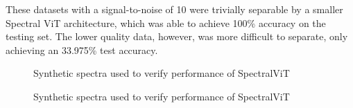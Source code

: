 These datasets with a signal-to-noise of 10 were trivially separable by a smaller Spectral ViT architecture, 
which was able to achieve 100\% accuracy on the testing set. The lower quality data, however, 
was more difficult to separate, only achieving an 33.975\% test accuracy.


\begin{figure}[h]
    \centering
    \qquad
    \caption{Synthetic spectra used to verify performance of SpectralViT\label{fig:synth_spectra}}
\end{figure}

\begin{figure}[h]
    \centering
    \qquad
    \caption{Synthetic spectra used to verify performance of SpectralViT\label{fig:synth_spectra}}
\end{figure}


